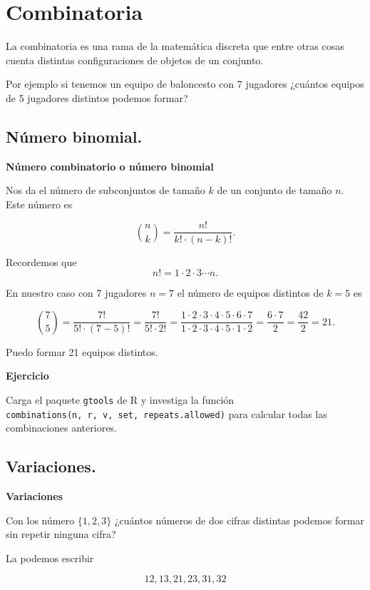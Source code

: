 \documentclass[]{book}
\begin{document}
\hypertarget{combinatoria}{%
\section{Combinatoria}\label{combinatoria}}

La combinatoria es una rama de la matemática discreta que entre otras cosas cuenta distintas configuraciones de objetos de un conjunto.

Por ejemplo si tenemos un equipo de baloncesto con 7 jugadores ¿cuántos equipos de 5 jugadores distintos podemos formar?

\hypertarget{nuxfamero-binomial.}{%
\subsection{Número binomial.}\label{nuxfamero-binomial.}}

\textbf{Número combinatorio o número binomial}

Nos da el número de subconjuntos de tamaño \(k\) de un conjunto de tamaño \(n\). Este número es

\[
{n\choose k} = \frac{n!}{k!\cdot (n-k)!}.
\]

Recordemos que
\[
n!=1\cdot 2\cdot 3\cdots n.
\]

En nuestro caso con 7 jugadores \(n=7\) el número de equipos distintos de \(k=5\) es

\[
{7\choose 5} = \frac{7!}{5!\cdot (7-5)!}=\frac{7!}{5!\cdot 2!}=
\frac{1\cdot 2\cdot 3 \cdot 4\cdot 5\cdot 6\cdot 7}{1\cdot 2\cdot 3 \cdot 4\cdot 5\cdot 1\cdot 2}=\frac{6\cdot 7}{2}=\frac{42}{2}=21.
\]

Puedo formar 21 equipos distintos.

\textbf{Ejercicio}

Carga el paquete \texttt{gtools} de R y investiga la función \texttt{combinations(n,\ r,\ v,\ set,\ repeats.allowed)} para calcular todas las combinaciones anteriores.

\hypertarget{variaciones.}{%
\subsection{Variaciones.}\label{variaciones.}}

\textbf{Variaciones}

Con los número \(\{1,2,3\}\) ¿cuántos números de dos cifras distintas podemos formar sin repetir ninguna cifra?

La podemos escribir

\[12,13,21,23,31,32\]
\end{document}
